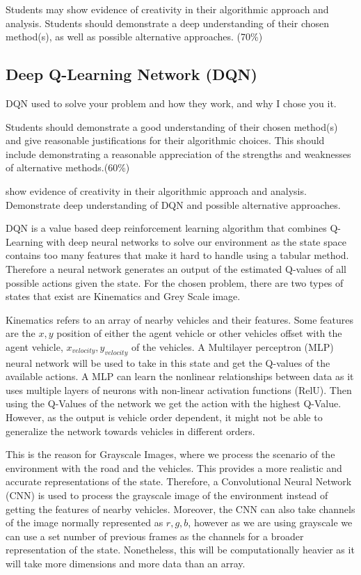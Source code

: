 \documentclass{article}
\begin{document}
Students may show evidence of creativity in their algorithmic approach and analysis. Students should demonstrate a deep understanding of their chosen method(s), as well as possible alternative approaches. (70\%)


\subsection{Deep Q-Learning Network (DQN)}

DQN used to solve your problem and how they work, and why I chose you it.

Students should demonstrate a good understanding of their chosen method(s) and give reasonable justifications for their algorithmic choices. 
This should include demonstrating a reasonable appreciation of the strengths and weaknesses of alternative methods.(60\%)

show evidence of creativity in their algorithmic approach and analysis.
Demonstrate deep understanding of DQN and possible alternative approaches. 


DQN is a value based deep reinforcement learning algorithm that combines Q-Learning with deep neural networks to solve our environment as the state space contains too many features that make it hard to handle using a tabular method.
Therefore a neural network generates an output of the estimated Q-values of all possible actions given the state.
For the chosen problem, there are two types of states that exist are Kinematics and Grey Scale image.

Kinematics refers to an array of nearby vehicles and their features. Some features are the \(x, y\) position of either the agent vehicle or other vehicles offset with the agent vehicle, \(x_{velocity}, y_{velocity}\) of the vehicles.
A Multilayer perceptron (MLP) neural network will be used to take in this state and get the Q-values of the available actions.
A MLP can learn the nonlinear relationships between data as it uses multiple layers of neurons with non-linear activation functions (RelU).
Then using the Q-Values of the network we get the action with the highest Q-Value.
However, as the output is vehicle order dependent, it might not be able to generalize the network towards vehicles in different orders.

This is the reason for Grayscale Images, where we process the scenario of the environment with the road and the vehicles.
This provides a more realistic and accurate representations of the state.
Therefore, a Convolutional Neural Network (CNN) is used to process the grayscale image of the environment instead of getting the features of nearby vehicles.
Moreover, the CNN can also take channels of the image normally represented as \(r,g,b\), however as we are using grayscale we can use a set number of previous frames as the channels for a broader representation of the state.
Nonetheless, this will be computationally heavier as it will take more dimensions and more data than an array.
\end{document}
